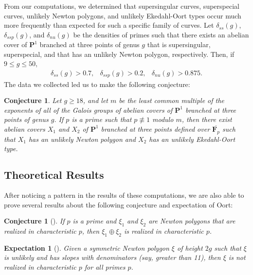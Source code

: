 \documentclass{article}
\newtheorem{expectation}[theorem]{Expectation}
\newtheorem{conjecture}[theorem]{Conjecture}
\theoremstyle{remark}
\theoremstyle{definition}
\begin{document}
\par From our computations, we determined that supersingular curves, superspecial curves, unlikely Newton polygons, and unlikely Ekedahl-Oort types occur much more frequently than expected for such a specific family of curves. Let $\delta_{ss}(g)$, $\delta_{ssp}(g)$, and $\delta_{nu}(g)$ be the densities of primes such that there exists an abelian cover of $\mathbf{P}^1$ branched at three points of genus $g$ that is supersingular, superspecial, and that has an unlikely Newton polygon, respectively. Then, if $9 \leq g \leq 50$, 
\[
\begin{array}{ccc}
    \delta_{ss}(g) > 0.7, &  \delta_{ssp}(g) > 0.2, & \delta_{nu}(g) > 0.875   .
\end{array}
\]
The data we collected led us to make the following conjecture: 

\begin{conjecture} \label{unlikely-density}
    Let $g \geq 18$, and let $m$ be the least common multiple of the exponents of all of the Galois groups of abelian covers of $\mathbf{P}^1$ branched at three points of genus $g$. If $p$ is a prime such that $p \not \equiv 1$ modulo $m$, then there exist abelian covers $X_1$ and $X_2$ of $\mathbf{P}^1$ branched at three points defined over $\overline{\mathbf{F}_p}$ such that $X_1$ has an unlikely Newton polygon and $X_2$ has an unlikely Ekedahl-Oort type.
\end{conjecture}


\subsection{Theoretical Results} \label{1.2}

\par \hspace{\parindent} After noticing a pattern in the results of these computations, we are also able to prove several results about the following conjecture and expectation of Oort:


\begin{conjecture}[]
    \label{oort_conjecture1}
    If $p$ is a prime and $\xi_1$ and $\xi_2$ are Newton polygons that are realized in characteristic $p$, then $\xi_1 \oplus \xi_2$ is realized in characteristic $p$.
\end{conjecture}

\begin{expectation}[]
    \label{expectation1}
    Given a symmetric Newton polygon $\xi$ of height $2g$ such that $\xi$ is unlikely and has slopes with denominators (say, greater than 11), then $\xi$ is not realized in characteristic $p$ for all primes $p$.
\end{expectation}
\end{document}
